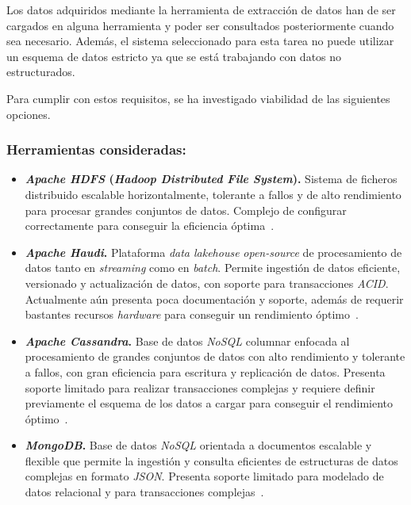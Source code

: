 Los datos adquiridos mediante la herramienta de extracción de datos han de ser cargados en alguna herramienta y poder ser consultados posteriormente cuando sea necesario. Además, el sistema seleccionado para esta tarea no puede utilizar un esquema de datos estricto ya que se está trabajando con datos no estructurados.

Para cumplir con estos requisitos, se ha investigado viabilidad de las siguientes opciones.

\subsubsection{Herramientas consideradas:}

\begin{itemize}
    \item \textbf{\textit{Apache HDFS} (\textit{Hadoop Distributed File System}).} Sistema de ficheros distribuido escalable horizontalmente, tolerante a fallos y de alto rendimiento para procesar grandes conjuntos de datos. Complejo de configurar correctamente para conseguir la eficiencia óptima~\cite{hdfsArchitecture}.
    \item \textbf{\textit{Apache Haudi}.} Plataforma \textit{data lakehouse} \textit{open-source} de procesamiento de datos tanto en \textit{streaming} como en \textit{batch}. Permite ingestión de datos eficiente, versionado y actualización de datos, con soporte para transacciones \textit{ACID}. Actualmente aún presenta poca documentación y soporte, además de requerir bastantes recursos \textit{hardware} para conseguir un rendimiento óptimo~\cite{hudiOverview}.
    \item \textbf{\textit{Apache Cassandra}.} Base de datos \textit{NoSQL} columnar enfocada al procesamiento de grandes conjuntos de datos con alto rendimiento y tolerante a fallos, con gran eficiencia para escritura y replicación de datos. Presenta soporte limitado para realizar transacciones complejas y requiere definir previamente el esquema de los datos a cargar para conseguir el rendimiento óptimo~\cite{cassandraOverview}.
    \item \textbf{\textit{MongoDB}.} Base de datos \textit{NoSQL} orientada a documentos escalable y flexible que permite la ingestión y consulta eficientes de estructuras de datos complejas en formato \textit{JSON}. Presenta soporte limitado para modelado de datos relacional y para transacciones complejas~\cite{mongodbArchitecture}.
\end{itemize}

